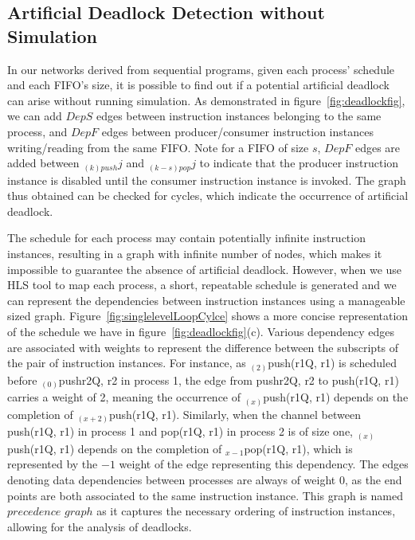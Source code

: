 \subsection{Artificial Deadlock Detection without Simulation}
In our networks derived from sequential programs, given each process' schedule and each FIFO's size, it is possible
to find out if a potential artificial deadlock can arise without running simulation. As demonstrated in figure~\ref{fig:deadlockfig}, we can add $DepS$ edges between instruction instances belonging to the same process, and $DepF$ edges between
producer/consumer instruction instances writing/reading from the same FIFO.
Note for a FIFO of size $s$, $DepF$ edges are added between 
$_{(k)push}j$ and $_{(k-s)pop}j$ 
to indicate that the producer instruction instance is disabled
until the consumer instruction instance is invoked. The graph thus obtained
can be checked for cycles, which indicate the occurrence of artificial deadlock.


The schedule for each process may contain potentially infinite instruction instances, resulting in a graph with infinite number of nodes,
which makes it impossible to guarantee the absence of artificial deadlock.
However, when we use HLS tool to map each process,
a short, repeatable schedule is generated and we can represent the
dependencies between instruction instances using a manageable
sized graph. 
Figure~\ref{fig:singlelevelLoopCylce} shows a more concise
representation of the schedule we have in figure~\ref{fig:deadlockfig}(c).
Various dependency edges are associated with weights to 
represent the difference between the subscripts of the pair of instruction
instances. For instance, as $_{(2)}$push(r1Q, r1) is 
scheduled before $_{(0)}$push{r2Q, r2} in process 1, the edge from push{r2Q, r2} %
to 
push(r1Q, r1)
carries
a weight of 2, meaning the occurrence of $_{(x)}$push(r1Q, r1) depends on the completion of 
$_{(x+2)}$push(r1Q, r1). Similarly, when the channel between 
push(r1Q, r1) in process 1 and pop(r1Q, r1) in process 2 is of size one, $_{(x)}$push(r1Q, r1) depends on the completion of $_{x-1}$pop(r1Q, r1), 
which is represented by the $-1$ weight of the edge representing this
dependency. The edges denoting data dependencies between processes
are always of weight 0, as the end points are both associated to the same instruction instance. This graph is named $precedence$  $graph$ as it captures the necessary ordering of instruction instances, allowing for the analysis of deadlocks.

